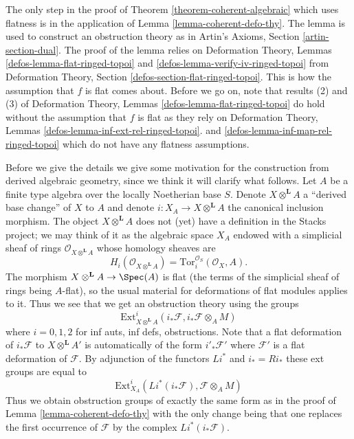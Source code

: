 \medskip\noindent
The only step in the proof of Theorem \ref{theorem-coherent-algebraic}
which uses flatness is in the application of
Lemma \ref{lemma-coherent-defo-thy}.
The lemma is used to construct an obstruction theory as in
Artin's Axioms, Section \ref{artin-section-dual}.
The proof of the lemma relies on
Deformation Theory, Lemmas \ref{defos-lemma-flat-ringed-topoi} and
\ref{defos-lemma-verify-iv-ringed-topoi} from
Deformation Theory, Section \ref{defos-section-flat-ringed-topoi}.
This is how the assumption that $f$ is flat comes about.
Before we go on, note that results (2) and (3) of
Deformation Theory, Lemmas \ref{defos-lemma-flat-ringed-topoi}
do hold without the assumption that $f$ is flat as they rely
on Deformation Theory, Lemmas \ref{defos-lemma-inf-ext-rel-ringed-topoi}.
and \ref{defos-lemma-inf-map-rel-ringed-topoi}
which do not have any flatness assumptions.

\medskip\noindent
Before we give the details we give some motivation for the construction
from derived algebraic geometry, since we think it will clarify what
follows. Let $A$ be a finite type algebra over the locally Noetherian
base $S$. Denote $X \otimes^\mathbf{L} A$ a ``derived base change''
of $X$ to $A$ and denote $i : X_A \to X \otimes^\mathbf{L} A$ the
canonical inclusion morphism. The object $X \otimes^\mathbf{L} A$
does not (yet) have a definition in the Stacks project; we may think of it
as the algebraic space $X_A$ endowed with a simplicial sheaf of rings
$\mathcal{O}_{X \otimes^\mathbf{L} A}$ whose homology sheaves are
$$
H_i(\mathcal{O}_{X \otimes^\mathbf{L} A}) =
\text{Tor}^{\mathcal{O}_S}_i(\mathcal{O}_X, A).
$$
The morphism $X \otimes^\mathbf{L} A \to \Spec(A)$ is flat
(the terms of the simplicial sheaf of rings being $A$-flat),
so the usual material for deformations of flat modules applies to it.
Thus we see that we get an obstruction theory using the groups
$$
\text{Ext}^i_{X \otimes^\mathbf{L} A}(i_*\mathcal{F},
i_*\mathcal{F} \otimes_A M)
$$
where $i = 0, 1, 2$ for inf auts, inf defs, obstructions. Note that
a flat deformation of $i_*\mathcal{F}$ to $X \otimes^\mathbf{L} A'$
is automatically of the form $i'_*\mathcal{F}'$ where $\mathcal{F}'$
is a flat deformation of $\mathcal{F}$. By adjunction
of the functors $Li^*$ and $i_* = Ri_*$ these ext groups are equal to
$$
\text{Ext}^i_{X_A}(Li^*(i_*\mathcal{F}), \mathcal{F} \otimes_A M)
$$
Thus we obtain obstruction groups of exactly the same form as in the
proof of Lemma \ref{lemma-coherent-defo-thy} with the only change being
that one replaces the first occurrence of $\mathcal{F}$ by the complex
$Li^*(i_*\mathcal{F})$.

